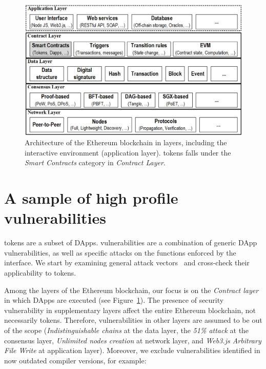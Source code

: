 
\begin{figure}[t!]
	\centering
	\includegraphics[width=1.0\linewidth]{figures/blockchain.png}
	\caption{Architecture of the Ethereum blockchain in layers, including the interactive environment (\ie application layer). \erc tokens falls under the \textit{Smart Contracts} category in \textit{Contract Layer}.}\label{fig:blockchain}
\end{figure}

\section{A sample of high profile vulnerabilities}\label{sec:vul}
\erc tokens are a subset of DApps. \erc vulnerabilities are a combination of generic DApp vulnerabilities, as well as specific attacks on the functions enforced by the \erc interface. We start by examining general attack vectors~\cite{SolidtySecBlog,EthSecServ,SoliditySecCon,ConsensysSecCon,LandoKL} and cross-check their applicability to \erc tokens.

Among the layers of the Ethereum blockchain, our focus is on the \textit{Contract layer} in which DApps are executed (see Figure~\ref{fig:blockchain}). The presence of security vulnerability in supplementary layers affect the entire Ethereum blockchain, not necessarily \erc tokens. Therefore, vulnerabilities in other layers are assumed to be out of the scope (\eg \textit{Indistinguishable chains} at the data layer, the \textit{51\% attack} at the consensus layer, \textit{Unlimited nodes creation} at network layer, and \textit{Web3.js Arbitrary File Write} at application layer). Moreover, we exclude vulnerabilities identified in now outdated compiler versions, for example:

